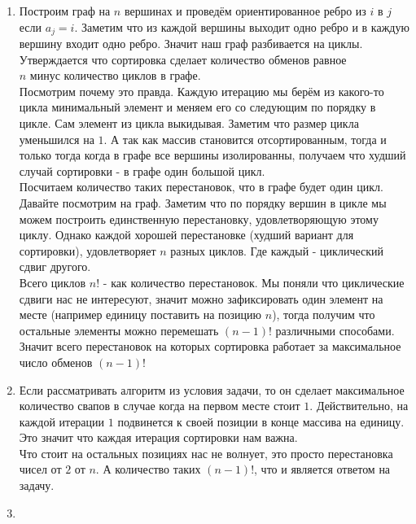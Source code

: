 \documentclass[a4paper, 10pt]{article}
\begin{document}
\begin{enumerate}

    \item{
        Построим граф на $n$ вершинах и проведём ориентированное ребро из $i$ в $j$ если $a_j = i$. Заметим что из каждой вершины выходит одно ребро и в каждую вершину входит одно ребро. Значит наш граф разбивается на циклы. \\Утверждается что сортировка сделает количество обменов равное\\ $n$ минус количество циклов в графе.\\
        Посмотрим почему это правда. Каждую итерацию мы берём из какого-то цикла минимальный элемент и меняем его со следующим по порядку в цикле. Сам элемент из цикла выкидывая. Заметим что размер цикла уменьшился на $1$. А так как массив становится отсортированным, тогда и только тогда когда в графе все вершины изолированны, получаем что худший случай сортировки - в графе один большой цикл.\\
        Посчитаем количество таких перестановок, что в графе будет один цикл.\\
        Давайте посмотрим на граф. Заметим что по порядку вершин в цикле мы можем построить единственную перестановку, удовлетворяющую этому циклу. Однако каждой хорошей перестановке (худший вариант для сортировки), удовлетворяет $n$ разных циклов. Где каждый - циклический сдвиг другого.\\
        Всего циклов $n!$ - как количество перестановок. 
        Мы поняли что циклические сдвиги нас не интересуют, значит можно зафиксировать один элемент на месте (например единицу поставить на позицию $n$), тогда получим что остальные элементы можно перемешать $(n - 1)!$ различными способами.\\
        Значит всего перестановок на которых сортировка работает за максимальное число обменов $(n - 1)!$
    }

    \item{
        Если рассматривать алгоритм из условия задачи, то он сделает максимальное количество свапов в случае когда на первом месте стоит $1$. Действительно, на каждой итерации $1$ подвинется к своей позиции в конце массива на единицу. Это значит что каждая итерация сортировки нам важна.\\
        Что стоит на остальных позициях нас не волнует, это просто перестановка чисел от $2$ от $n$. А количество таких $(n - 1)!$, что и является ответом на задачу.
    }

    \item{
        \begin{enumerate}
        

\end{enumerate}}
\end{enumerate}
\end{document}
